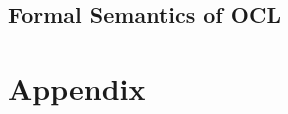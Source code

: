 \documentclass[10pt,DIV12,a4paper,openright,twoside,abstracton]{scrreprt}
\begin{document}
\isatagannexa
  \appendix
\endisatagannexa
\chapter{Formal Semantics of OCL}

\isatagafp

\endisatagafp
\isatagannexa















%
%
% 
% 


\endisatagannexa
\isatagafp
\endisatagafp



\appendix
\part{Appendix}


\isatagannexa
  \clearpage {\small \tableofcontents }
\endisatagannexa
\end{document}
